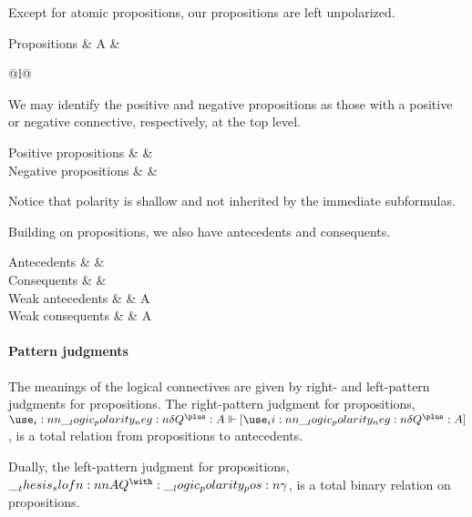 Except for atomic propositions, our propositions are left unpolarized.
\begin{syntax*}
  Propositions & A &
    \begin{array}[t]{@{}l@{}}
       \mid {} \\
      \mathllap{\mid {}}
         \mid {}
    \end{array}
\end{syntax*}
We may identify the positive and negative propositions as those with a positive or negative connective, respectively, at the top level.
\begin{syntax*}
  Positive propositions &  &
     \mid {}
  \\
  Negative propositions &  &
     \mid {}
\end{syntax*}
Notice that polarity is shallow and not inherited by the immediate subformulas.

Building on propositions, we also have antecedents and consequents.
\begin{syntax*}
  Antecedents & \n{\delta} &  \mid {}
  \\
  Consequents & \p{\gamma} &  \mid {}
  \\
  Weak antecedents & \delta & A \mid {}
  \\
  Weak consequents & \gamma & A \mid {}
\end{syntax*}

\paragraph{Pattern judgments}
The meanings of the logical connectives are given by right- and left-pattern judgments for propositions.
The right-pattern judgment for propositions, $\slofp{\n{\delta} ||- Q^{\plus} : A}$, is a total relation from propositions to antecedents.
Dually, the left-pattern judgment for propositions, $\slofn{A ||- Q^{\with} : \p{\gamma}}$, is a total binary relation on propositions.

